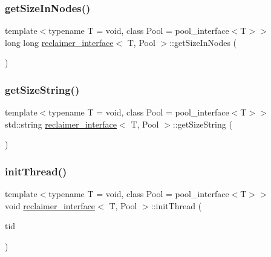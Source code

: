 \mbox{\label{classreclaimer__interface_aff9a466872ab7972a27e817c7d776936}} 
\subsubsection{\texorpdfstring{get\+Size\+In\+Nodes()}{getSizeInNodes()}}
{\footnotesize\ttfamily template$<$typename T  = void, class Pool  = pool\+\_\+interface$<$\+T$>$$>$ \\
long long \hyperlink{classreclaimer__interface}{reclaimer\+\_\+interface}$<$ T, Pool $>$\+::get\+Size\+In\+Nodes (\begin{DoxyParamCaption}{ }\end{DoxyParamCaption})\hspace{0.3cm}{\ttfamily [inline]}}

\mbox{\label{classreclaimer__interface_a949bf6cedb35e2bb0b853b0b7ef7b03e}} 
\subsubsection{\texorpdfstring{get\+Size\+String()}{getSizeString()}}
{\footnotesize\ttfamily template$<$typename T  = void, class Pool  = pool\+\_\+interface$<$\+T$>$$>$ \\
std\+::string \hyperlink{classreclaimer__interface}{reclaimer\+\_\+interface}$<$ T, Pool $>$\+::get\+Size\+String (\begin{DoxyParamCaption}{ }\end{DoxyParamCaption})\hspace{0.3cm}{\ttfamily [inline]}}

\mbox{\label{classreclaimer__interface_a0fa3f1bddb187e68931f0792fbba812c}} 
\subsubsection{\texorpdfstring{init\+Thread()}{initThread()}}
{\footnotesize\ttfamily template$<$typename T  = void, class Pool  = pool\+\_\+interface$<$\+T$>$$>$ \\
void \hyperlink{classreclaimer__interface}{reclaimer\+\_\+interface}$<$ T, Pool $>$\+::init\+Thread (\begin{DoxyParamCaption}\item[{const int}]{tid }\end{DoxyParamCaption})\hspace{0.3cm}{\ttfamily [inline]}}

